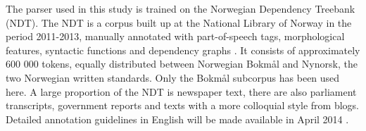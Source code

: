 \documentclass[11pt]{article}
\begin{document}
The parser used in this study is trained on the Norwegian Dependency Treebank (NDT). The NDT is a corpus built up at the National Library of Norway in the period 2011-2013, manually annotated with part-of-speech tags, morphological features, syntactic functions and dependency graphs \cite{Sol14, Sol13}. It consists of approximately 600 000 tokens, equally distributed between Norwegian Bokmål and Nynorsk, the two Norwegian written standards. Only the Bokmål subcorpus has been used here. A large proportion of the NDT is newspaper text, there are also parliament transcripts, government reports and texts with a more colloquial style from blogs. Detailed annotation guidelines in English will be made available in April 2014 \cite{Kinn2013}.





\end{document}
